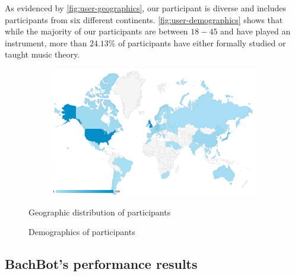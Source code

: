 As evidenced by \vref{fig:user-geographics}, our participant is diverse and
includes participants from six different continents.
\vref{fig:user-demographics} shows that while the majority of our participants
are between $18-45$ and have played an instrument, more than
$24.13\%$ of participants have either formally studied or taught music theory.

\begin{figure}[p]
  \centering
  \begin{subfigure}[b]{0.98\textwidth}
    \centering
    \includegraphics[width=1.0\linewidth]{participants-by-country.png}
  \end{subfigure}
  \begin{subfigure}[c]{0.55\textwidth}
    \centering
    
  \end{subfigure}
  \begin{subfigure}[c]{0.44\textwidth}
    \centering
    
  \end{subfigure}
  \caption{Geographic distribution of participants}
  \label{fig:user-geographics}
\end{figure}

\begin{figure}[tb]
  \centering
  
  \caption{Demographics of participants}
  \label{fig:user-demographics}
\end{figure}

\subsection{BachBot's performance results}


